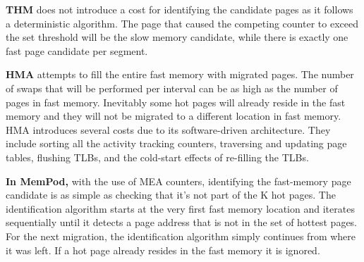 
	\textbf{THM} does not introduce a cost for identifying the candidate pages as it follows a deterministic algorithm. The page that caused the competing counter to exceed the set threshold will be the slow memory candidate, while there is exactly one fast page candidate per segment.

    \textbf{HMA} attempts to fill the entire fast memory with migrated pages. The number of swaps that will be performed per interval can be as high as the number of pages in fast memory. Inevitably some hot pages will already reside in the fast memory and they will not be migrated to a different location in fast memory. 
HMA introduces several costs due to its software-driven architecture.
They include sorting all the activity tracking counters, traversing and updating page tables, flushing TLBs, and the cold-start effects of re-filling
the TLBs.

	\textbf{In MemPod,} with the use of MEA counters, identifying the fast-memory page candidate is as simple as checking that it's not part of the K hot pages. The identification algorithm starts at the very first fast memory location and iterates sequentially until it detects a page address that is not in the set of hottest pages. For the next migration, the identification algorithm simply continues from where it was left. If a hot page already resides in the fast memory it is ignored.

